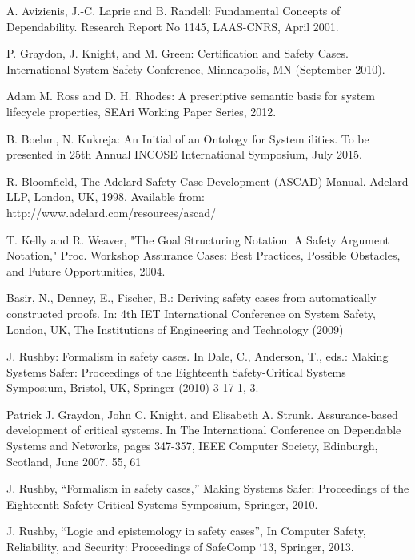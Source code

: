 \documentclass{article} %
\begin{document}
\small{
\begin{thebibliography}{}


A. Avizienis, J.-C. Laprie and B. Randell: Fundamental Concepts of Dependability. Research Report No 1145, LAAS-CNRS, April 2001.


P. Graydon, J. Knight, and M. Green: Certification and Safety Cases. International System Safety Conference, Minneapolis, MN (September 2010).

Adam M. Ross and D. H. Rhodes: A prescriptive semantic basis for system lifecycle properties, SEAri Working Paper Series, 2012.

B. Boehm, N. Kukreja: An Initial of an Ontology for System ilities. To be presented in 25th Annual INCOSE International Symposium, July 2015.

R. Bloomfield, The Adelard Safety Case Development (ASCAD) Manual. Adelard LLP, London, UK, 1998. Available from: http://www.adelard.com/resources/ascad/

T. Kelly and R. Weaver, "The Goal Structuring Notation: A Safety Argument Notation," Proc. Workshop Assurance Cases: Best Practices, Possible Obstacles, and Future Opportunities, 2004. 

Basir, N., Denney, E., Fischer, B.: Deriving safety cases from automatically constructed proofs. In: 4th IET International Conference on System Safety, London, UK, The Institutions of Engineering and Technology (2009)

J. Rushby: Formalism in safety cases. In Dale, C., Anderson, T., eds.: Making Systems Safer: Proceedings of the Eighteenth Safety-Critical Systems Symposium, Bristol, UK, Springer (2010) 3-17 1, 3.

Patrick J. Graydon, John C. Knight, and Elisabeth A. Strunk. Assurance-based
development of critical systems. In The International Conference on Dependable 
Systems and Networks, pages 347-357, IEEE Computer Society, Edinburgh, 
Scotland, June 2007. 55, 61

J. Rushby, “Formalism in safety cases,” Making Systems Safer: Proceedings of the Eighteenth Safety-Critical Systems Symposium, Springer, 2010.

J. Rushby, “Logic and epistemology in safety cases”, In Computer Safety, Reliability, and Security: Proceedings of SafeComp ‘13, Springer, 2013.


\end{thebibliography}}
\end{document}
